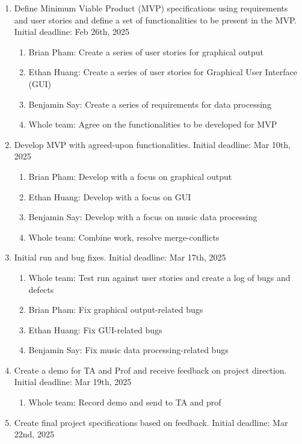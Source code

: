 \documentclass{article}
\begin{document}
\begin{enumerate}
    \item Define Minimum Viable Product (MVP) specifications using requirements and user stories and define a set of functionalities to be present in the MVP. Initial deadline: Feb 26th, 2025
    \begin{enumerate}
        \item Brian Pham: Create a series of user stories for graphical output
        \item Ethan Huang: Create a series of user stories for Graphical User Interface (GUI)
        \item Benjamin Say: Create a series of requirements for data processing
        \item Whole team: Agree on the functionalities to be developed for MVP\end{enumerate}
    \item Develop MVP with agreed-upon functionalities. Initial deadline: Mar 10th, 2025
    \begin{enumerate}
        \item Brian Pham: Develop with a focus on graphical output
        \item Ethan Huang: Develop with a focus on GUI
        \item Benjamin Say: Develop with a focus on music data processing
        \item Whole team: Combine work, resolve merge-conflicts\end{enumerate}
    \item Initial run and bug fixes. Initial deadline: Mar 17th, 2025
    \begin{enumerate}
        \item Whole team: Test run against user stories and create a log of bugs and defects
        \item Brian Pham: Fix graphical output-related bugs
        \item Ethan Huang: Fix GUI-related bugs
        \item Benjamin Say: Fix music data processing-related bugs \end{enumerate}
    \item Create a demo for TA and Prof and receive feedback on project direction. Initial deadline: Mar 19th, 2025
    \begin{enumerate}
        \item Whole team: Record demo and send to TA and prof \end{enumerate}
    \item Create final project specifications based on feedback. Initial deadline: Mar 22nd, 2025

\end{enumerate}
\end{document}
